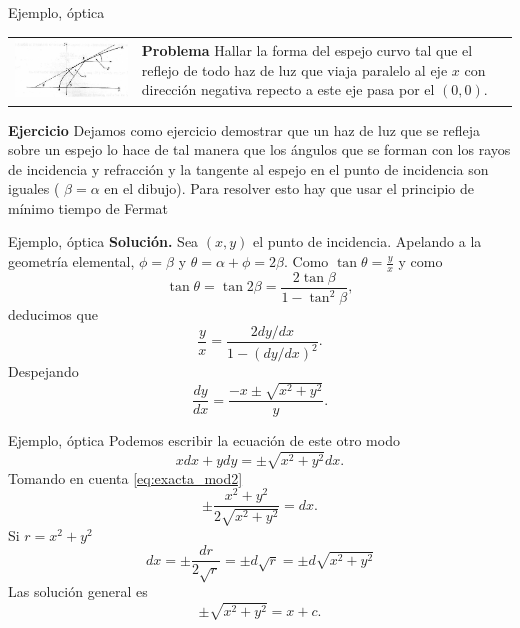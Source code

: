 \documentclass[handout,hyperref={colorlinks=true}]{beamer}
\newcommand{\nl}{\onslide<+-> }
\begin{document}
\begin{frame}{Ejemplo, óptica}
\nl\begin{tabular}{m{5cm} m{4.5cm} }
\includegraphics[scale=.4]{imagenes/espejo.png} & \textbf{Problema} Hallar la forma del espejo curvo tal que el reflejo de todo haz de luz que viaja paralelo al eje $x$ con dirección
negativa repecto a este eje pasa por el $(0,0)$. \\
\end{tabular}
\nl \textbf{Ejercicio} Dejamos como ejercicio demostrar que un haz de luz que se refleja sobre un espejo lo hace de tal manera que los ángulos que se forman con los rayos 
de incidencia y refracción y la tangente al espejo en el punto de incidencia son iguales ( $\beta=\alpha$ en el dibujo). Para resolver esto hay que usar el principio
de mínimo tiempo de Fermat


\end{frame}


\begin{frame}{Ejemplo, óptica}
 \textbf{Solución.} Sea $(x,y)$ el punto de incidencia. Apelando a la geometría elemental, $\phi=\beta$ y $\theta=\alpha+\phi=2\beta$. Como $\tan\theta=\frac{y}{x}$
  y como
  \[\tan\theta =\tan 2\beta=\frac{2\tan\beta}{1-\tan^2\beta},\]
deducimos que
\[\frac{y}{x}=\frac{2 dy/dx}{1-(dy/dx)^2}.\]
Despejando
\[\frac{dy}{dx} =\frac{-x\pm\sqrt{x^2+y^2}}{y}.\]

\end{frame}


\begin{frame}{Ejemplo, óptica}
Podemos escribir la ecuación de este otro modo
\[xdx+ydy=\pm\sqrt{x^2+y^2}dx.\]
Tomando en cuenta \eqref{eq:exacta_mod2}
\[\pm\frac{x^2+y^2}{2\sqrt{x^2+y^2}}=dx.\]
Si $r=x^2+y^2$
\[dx=\pm\frac{dr}{2\sqrt{r}}=\pm d\sqrt{r}=\pm d\sqrt{x^2+y^2}\]
Las solución general es
\[\pm\sqrt{x^2+y^2}=x+c.\]
 


\end{frame}
\end{document}
